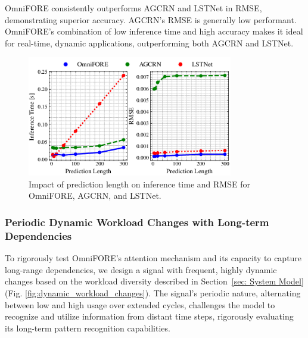 \documentclass{ieeetmlcn}
\begin{document}
OmniFORE consistently outperforms AGCRN and LSTNet in RMSE, demonstrating superior accuracy. AGCRN's RMSE is generally low performant. OmniFORE's combination of low inference time and high accuracy makes it ideal for real-time, dynamic applications, outperforming both AGCRN and LSTNet.

\begin{figure}\centering
\centering
\centering\includegraphics[width=0.8\textwidth]{img/pred_vs_inf.png}
\caption{Impact of prediction length on inference time and RMSE for OmniFORE, AGCRN, and LSTNet.}
\label{fig:pred_vs_inf}
\end{figure}
\subsubsection{\textbf{Periodic Dynamic Workload Changes with Long-term Dependencies}}

To rigorously test OmniFORE's attention mechanism and its capacity to capture long-range dependencies, we design a signal with frequent, highly dynamic changes based on the workload diversity described in Section~\ref{sec: System Model} (Fig. \ref{fig:dynamic_workload_changes}). The signal's periodic nature, alternating between low and high usage over extended cycles, challenges the model to recognize and utilize information from distant time steps, rigorously evaluating its long-term pattern recognition capabilities.
\end{document}
